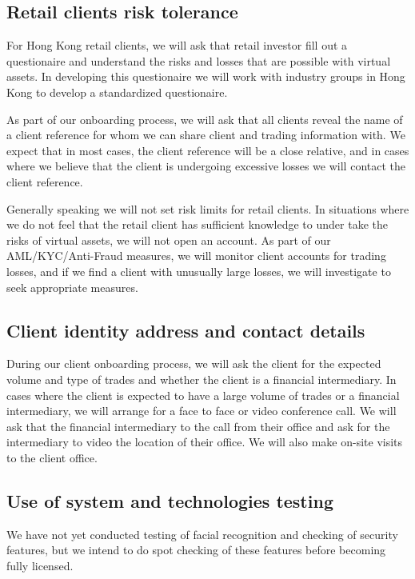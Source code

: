 \subsection{Retail clients risk tolerance}

For Hong Kong retail clients, we will ask that retail investor fill
out a questionaire and understand the risks and losses that are
possible with virtual assets.  In developing this questionaire we will
work with industry groups in Hong Kong to develop a standardized
questionaire.

As part of our onboarding process, we will ask that all clients reveal
the name of a client reference for whom we can share client and
trading information with.  We expect that in most cases, the client
reference will be a close relative, and in cases where we believe that
the client is undergoing excessive losses we will contact the client
reference.

Generally speaking we will not set risk limits for retail clients.  In
situations where we do not feel that the retail client has sufficient
knowledge to under take the risks of virtual assets, we will not open
an account.  As part of our AML/KYC/Anti-Fraud measures, we will
monitor client accounts for trading losses, and if we find a client
with unusually large losses, we will investigate to seek appropriate
measures.

\subsection{Client identity address and contact details}
During our client onboarding process, we will ask the client for the
expected volume and type of trades and whether the client is a
financial intermediary.  In cases where the client is expected to have
a large volume of trades or a financial intermediary, we will arrange
for a face to face or video conference call.  We will ask that the
financial intermediary to the call from their office and ask for the
intermediary to video the location of their office.  We will also make
on-site visits to the client office.

\subsection{Use of system and technologies testing}
We have not yet conducted testing of facial recognition and checking
of security features, but we intend to do spot checking of these
features before becoming fully licensed.

